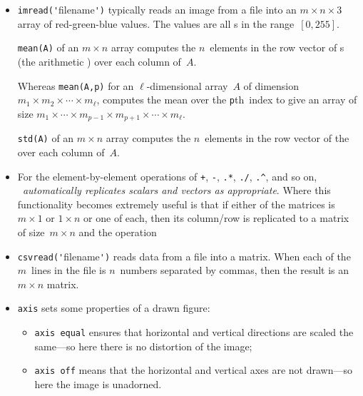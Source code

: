 \begin{itemize}
\begin{itemize}
\item  {}\verb|imread('|filename\verb|')| typically reads an image from a file into an \(m\times n\times 3\) array of red-green-blue values. 
The values are all s in the range~\([0,255]\).

\itemme {}\verb|mean(A)| of an \(m\times n\) array computes the \(n\)~elements in the row vector of s (the arithmetic ) over each column of~\(A\).

Whereas \verb|mean(A,p)| for an \(\ell\)-dimensional array~\(A\) of dimension \(m_1\times m_2\times\cdots\times m_\ell\),  computes the mean over the \verb|p|th~index to give an array of size \(m_1\times\cdots\times m_{p-1}\times m_{p+1}\times\cdots\times m_\ell\).

\itemme {}\verb|std(A)| of an \(m\times n\) array computes the \(n\)~elements in the row vector of the  over each column of~\(A\).

\item For the element-by-element operations of \verb|+|, \verb|-|, \verb|.*|, \verb|./|, \verb|.^|, and so on, \emph{\script\ automatically replicates scalars and vectors as appropriate}.
Where this functionality becomes extremely useful is that if either  of the matrices is \(m\times1\) or \(1\times n\) or one of each, then its column\slash row is replicated to a matrix of size~\(m\times n\) and the operation 

\item  {}\verb|csvread('|filename\verb|')| reads data from a file into a matrix.
When each of the \(m\)~lines in the file is \(n\)~numbers separated by commas, then the result is an \(m\times n\) matrix. 


\item {}\verb|axis| sets some properties of a drawn figure:
\begin{itemize}
\item \verb|axis equal| ensures that horizontal and vertical directions are scaled the same---so here there is no distortion of the image;
\item \verb|axis off| means that the horizontal and vertical axes are not drawn---so here the image is unadorned.
\end{itemize}
\end{itemize}





\end{itemize}
